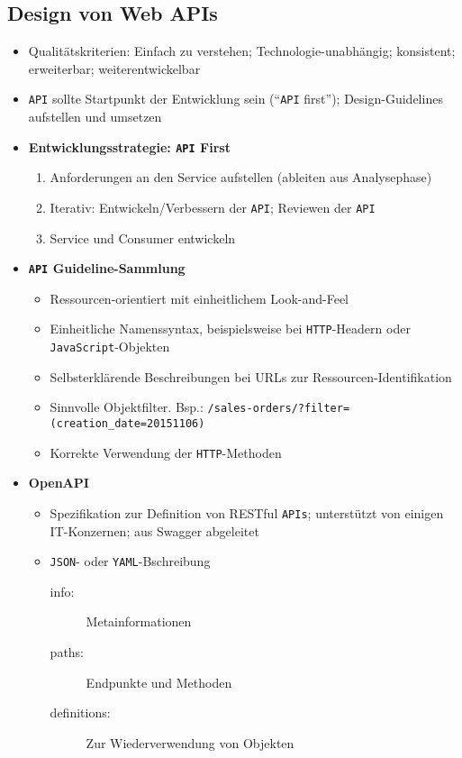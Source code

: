 \subsection{Design von Web APIs}
\begin{itemize}
	\item Qualitätskriterien: Einfach zu verstehen; Technologie-unabhängig; konsistent; erweiterbar; weiterentwickelbar
	\item \texttt{API} sollte Startpunkt der Entwicklung sein ("`\texttt{API} first"'); Design-Guidelines aufstellen und umsetzen
	\item \textbf{Entwicklungsstrategie: \texttt{API} First}
	\begin{enumerate}
		\item Anforderungen an den Service aufstellen (ableiten aus Analysephase)
		\item Iterativ: Entwickeln/Verbessern der \texttt{API}; Reviewen der \texttt{API}
		\item Service und Consumer entwickeln
	\end{enumerate}
	\item \textbf{\texttt{API} Guideline-Sammlung}
	\begin{itemize}
		\item Ressourcen-orientiert mit einheitlichem Look-and-Feel
		\item Einheitliche Namenssyntax, beispielsweise bei \texttt{HTTP}-Headern oder \texttt{JavaScript}-Objekten
		\item Selbsterklärende Beschreibungen bei URLs zur Ressourcen-Identifikation
		\item Sinnvolle Objektfilter. Bsp.: \texttt{/sales-orders/?filter=(creation\_date=20151106)}
		\item Korrekte Verwendung der \texttt{HTTP}-Methoden
	\end{itemize}
	\item \textbf{OpenAPI}
	\begin{itemize}
		\item Spezifikation zur Definition von RESTful \texttt{APIs}; unterstützt von einigen IT-Konzernen; aus Swagger abgeleitet
		\item \texttt{JSON}- oder \texttt{YAML}-Bschreibung
		\begin{description}
			\item[info:] Metainformationen
			\item[paths:] Endpunkte und Methoden
			\item[definitions:] Zur Wiederverwendung von Objekten

\end{description}
\end{itemize}
\end{itemize}
